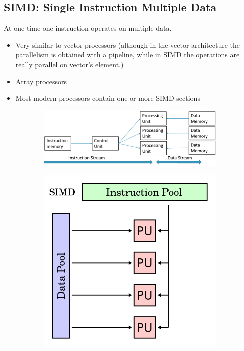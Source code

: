 \subsection{SIMD: Single Instruction Multiple Data}

At one time one instruction operates on multiple data.

\begin{itemize}
    \item Very similar to vector processors (although in the vector architecture the parallelism is obtained with a pipeline, while in SIMD the operations are really parallel on vector’s element.)
    \item Array processors
    \item Most modern processors contain one or more SIMD sections
\end{itemize}

\begin{figure}[ht]
\centering
\begin{subfigure}{.7\textwidth}
  \centering
  \includegraphics[width=.9\textwidth]{figure_parallel/simd.png}
\end{subfigure}%
\begin{subfigure}{.3\textwidth}
  \centering
  \includegraphics[width=.9\textwidth]{figure_parallel/simd2.png}
\end{subfigure}
\end{figure}

